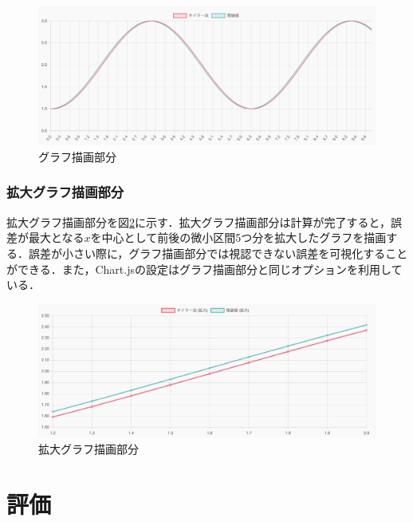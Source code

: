 \documentclass[a4paper, 12pt]{ltjsarticle}
\begin{document}
\begin{figure}[h]
\begin{center}
\includegraphics[clip,width=\textwidth,keepaspectratio]{sim-gurafu.png}
\end{center}
\caption{グラフ描画部分}
\label{fig:グラフ描画部分}
\end{figure}

\clearpage

\subsubsection{拡大グラフ描画部分}
拡大グラフ描画部分を図\ref{fig:拡大グラフ描画部分}に示す．拡大グラフ描画部分は計算が完了すると，誤差が最大となる$x$を中心として前後の微小区間5つ分を拡大したグラフを描画する．誤差が小さい際に，グラフ描画部分では視認できない誤差を可視化することができる．また，Chart.jsの設定はグラフ描画部分と同じオプションを利用している．

\begin{figure}[h]
\begin{center}
\includegraphics[clip,width=\textwidth,keepaspectratio]{sim-kakudai-gurafu.png}
\end{center}
\caption{拡大グラフ描画部分}
\label{fig:拡大グラフ描画部分}
\end{figure}
\clearpage
\section{評価}
\end{document}
